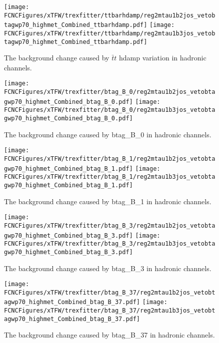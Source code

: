 \begin{figure}[H]
\centering
\texttt{[image: \\FCNCFigures/xTFW/trexfitter/ttbarhdamp/reg2mtau1b2jos\_vetobtagwp70\_highmet\_Combined\_ttbarhdamp.pdf]}
\texttt{[image: \\FCNCFigures/xTFW/trexfitter/ttbarhdamp/reg2mtau1b3jos\_vetobtagwp70\_highmet\_Combined\_ttbarhdamp.pdf]}
\caption{The background change caused by $\bar{t}t$ hdamp variation in hadronic channels.}
\label{fig:xTFW_ttbarhdamp}
\end{figure}

\begin{figure}[H]
\centering
\texttt{[image: \\FCNCFigures/xTFW/trexfitter/btag\_B\_0/reg2mtau1b2jos\_vetobtagwp70\_highmet\_Combined\_btag\_B\_0.pdf]}
\texttt{[image: \\FCNCFigures/xTFW/trexfitter/btag\_B\_0/reg2mtau1b3jos\_vetobtagwp70\_highmet\_Combined\_btag\_B\_0.pdf]}
\caption{The background change caused by btag\_B\_0 in hadronic channels.}
\label{fig:xTFW_btag_B_0}
\end{figure}

\begin{figure}[H]
\centering
\texttt{[image: \\FCNCFigures/xTFW/trexfitter/btag\_B\_1/reg2mtau1b2jos\_vetobtagwp70\_highmet\_Combined\_btag\_B\_1.pdf]}
\texttt{[image: \\FCNCFigures/xTFW/trexfitter/btag\_B\_1/reg2mtau1b3jos\_vetobtagwp70\_highmet\_Combined\_btag\_B\_1.pdf]}
\caption{The background change caused by btag\_B\_1 in hadronic channels.}
\label{fig:xTFW_btag_B_1}
\end{figure}

\begin{figure}[H]
\centering
\texttt{[image: \\FCNCFigures/xTFW/trexfitter/btag\_B\_3/reg2mtau1b2jos\_vetobtagwp70\_highmet\_Combined\_btag\_B\_3.pdf]}
\texttt{[image: \\FCNCFigures/xTFW/trexfitter/btag\_B\_3/reg2mtau1b3jos\_vetobtagwp70\_highmet\_Combined\_btag\_B\_3.pdf]}
\caption{The background change caused by btag\_B\_3 in hadronic channels.}
\label{fig:xTFW_btag_B_3}
\end{figure}

\begin{figure}[H]
\centering
\texttt{[image: \\FCNCFigures/xTFW/trexfitter/btag\_B\_37/reg2mtau1b2jos\_vetobtagwp70\_highmet\_Combined\_btag\_B\_37.pdf]}
\texttt{[image: \\FCNCFigures/xTFW/trexfitter/btag\_B\_37/reg2mtau1b3jos\_vetobtagwp70\_highmet\_Combined\_btag\_B\_37.pdf]}
\caption{The background change caused by btag\_B\_37 in hadronic channels.}
\label{fig:xTFW_btag_B_37}
\end{figure}

